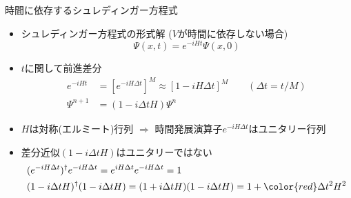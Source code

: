 \begin{frame}[t]{時間に依存するシュレディンガー方程式}
  \begin{itemize}
  \item シュレディンガー方程式の形式解 ($V$が時間に依存しない場合)
    \[
    \Psi(x,t) = e^{-i H t} \Psi(x,0)
    \]
  \item $t$に関して前進差分
    \begin{align*}
      e^{-i H t} &= [e^{-i H \Delta t}]^M \approx [1 - i H \Delta t]^M \qquad (\Delta t = t / M) \\
      \Psi^{n+1} &= (1 -  i \Delta t H) \Psi^{n}
    \end{align*}
  \item $H$は対称(エルミート)行列 $\Rightarrow$ 時間発展演算子$e^{-i H \Delta t}$はユニタリー行列
  \item 差分近似$(1 -  i \Delta t H)$はユニタリーではない
    \begin{align*}
      & (e^{-i H \Delta t})^\dagger e^{-i H \Delta t} = e^{i H \Delta t} e^{-i H \Delta t} = 1 \\
      & (1 -  i \Delta t H)^\dagger (1 -  i \Delta t H) = (1 +  i \Delta t H) (1 -  i \Delta t H) = 1 + {\color{red} \Delta t^2 H^2}
    \end{align*}
  \end{itemize}
\end{frame}

